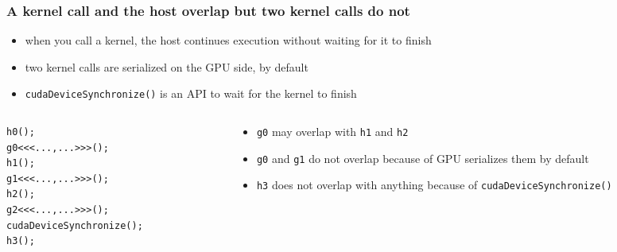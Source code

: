 \documentclass[12pt,dvipdfmx]{beamer}
\begin{document}
\begin{frame}[fragile]
  \frametitle{A kernel call and the host overlap but two kernel calls do not}
  \begin{itemize}
  \item when you call a kernel,
    the host continues execution without waiting for it to finish
  \item two kernel calls are serialized on the GPU side, by default
  \item {\tt cudaDeviceSynchronize()} is an API to wait for the kernel to finish
  \end{itemize}

  \begin{columns}
    \begin{column}{0.35\textwidth}
\begin{lstlisting}
h0();
g0<<<...,...>>>();
h1();
g1<<<...,...>>>(); 
h2();
g2<<<...,...>>>(); 
cudaDeviceSynchronize();
h3();
\end{lstlisting}
    \end{column}
    \begin{column}{0.65\textwidth}
\begin{itemize}
\item {\tt g0} may overlap with {\tt h1} and {\tt h2}
\item {\tt g0} and {\tt g1} do not overlap because of GPU serializes them by default
\item {\tt h3} does not overlap with anything because of
  {\tt cudaDeviceSynchronize()}
\end{itemize}
\end{column}    
\end{columns}
  
\end{frame}
\end{document}
